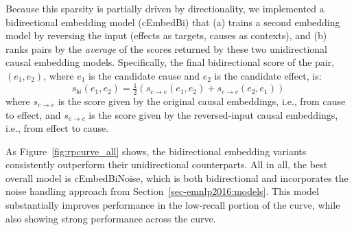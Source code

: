 Because this sparsity is partially driven by directionality, 
we implemented a bidirectional embedding model (cEmbedBi) that (a) trains a second embedding model by reversing the input (effects as targets, causes as contexts), and (b) ranks pairs by the \textit{average} of the scores returned by these two unidirectional causal embedding models. 
Specifically, the final bidirectional score of the pair, $(e_1, e_2)$, where $e_1$ is the candidate cause and $e_2$ is the candidate effect, is:
\begin{equation}
s_{bi}(e_1, e_2) = \tfrac{1}{2}(s_{c{\rightarrow}e}(e_1, e_2) + s_{e \rightarrow c}(e_2, e_1))
\end{equation}
where $s_{c \rightarrow e}$ is the score given by the original causal embeddings, i.e., from cause to effect, and $s_{e \rightarrow c}$ is the score given by the reversed-input causal embeddings, i.e., from effect to cause.

As Figure~\ref{fig:rpcurve_all} shows, the bidirectional embedding variants consistently outperform their unidirectional counterparts. 
All in all, the best overall model is cEmbedBiNoise, which is both bidirectional and incorporates the noise handling approach from Section~\ref{sec-emnlp2016:models}. This model substantially improves performance in the low-recall portion of the curve, while also showing strong performance across the curve. 



